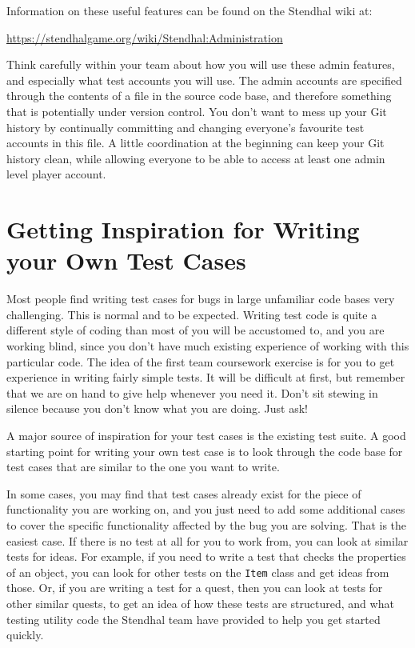 \documentclass[
]{book}
\begin{document}
Information on these useful features can be found on the Stendhal wiki at:

\url{https://stendhalgame.org/wiki/Stendhal:Administration}

Think carefully within your team about how you will use these admin features, and especially what test accounts you will use. The admin accounts are specified through the contents of a file in the source code base, and therefore something that is potentially under version control. You don't want to mess up your Git history by continually committing and changing everyone's favourite test accounts in this file. A little coordination at the beginning can keep your Git history clean, while allowing everyone to be able to access at least one admin level player account.

\hypertarget{inspiration}{%
\section{Getting Inspiration for Writing your Own Test Cases}\label{inspiration}}

Most people find writing test cases for bugs in large unfamiliar code bases very challenging. This is normal and to be expected. Writing test code is quite a different style of coding than most of you will be accustomed to, and you are working blind, since you don't have much existing experience of working with this particular code. The idea of the first team coursework exercise is for you to get experience in writing fairly simple tests. It will be difficult at first, but remember that we are on hand to give help whenever you need it. Don't sit stewing in silence because you don't know what you are doing. Just ask!

A major source of inspiration for your test cases is the existing test suite. A good starting point for writing your own test case is to look through the code base for test cases that are similar to the one you want to write.

In some cases, you may find that test cases already exist for the piece of functionality you are working on, and you just need to add some additional cases to cover the specific functionality affected by the bug you are solving. That is the easiest case. If there is no test at all for you to work from, you can look at similar tests for ideas. For example, if you need to write a test that checks the properties of an object, you can look for other tests on the \texttt{Item} class and get ideas from those. Or, if you are writing a test for a quest, then you can look at tests for other similar quests, to get an idea of how these tests are structured, and what testing utility code the Stendhal team have provided to help you get started quickly.
\end{document}
